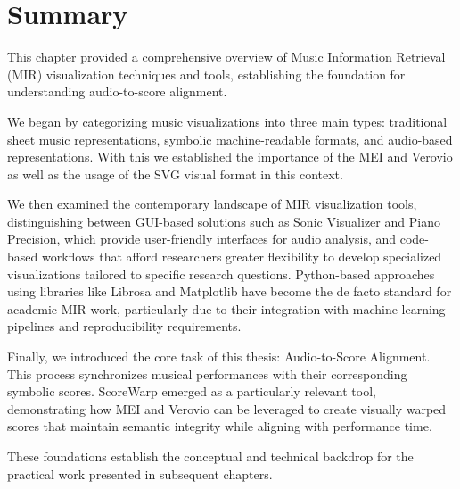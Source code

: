 \section{Summary}\label{sec:summary}
This chapter provided a comprehensive overview of Music Information Retrieval (MIR) visualization techniques and tools, establishing the foundation for understanding audio-to-score alignment. 

We began by categorizing music visualizations into three main types: traditional sheet music representations, symbolic machine-readable formats, and audio-based representations. With this we established the importance of the MEI and Verovio as well as the usage of the SVG visual format in this context.

We then examined the contemporary landscape of MIR visualization tools, distinguishing between GUI-based solutions such as Sonic Visualizer and Piano Precision, which provide user-friendly interfaces for audio analysis, and code-based workflows that afford researchers greater flexibility to develop specialized visualizations tailored to specific research questions. Python-based approaches using libraries like Librosa and Matplotlib have become the de facto standard for academic MIR work, particularly due to their integration with machine learning pipelines and reproducibility requirements.

Finally, we introduced the core task of this thesis: Audio-to-Score Alignment. This process synchronizes musical performances with their corresponding symbolic scores. ScoreWarp emerged as a particularly relevant tool, demonstrating how MEI and Verovio can be leveraged to create visually warped scores that maintain semantic integrity while aligning with performance time.

These foundations establish the conceptual and technical backdrop for the practical work presented in subsequent chapters.
